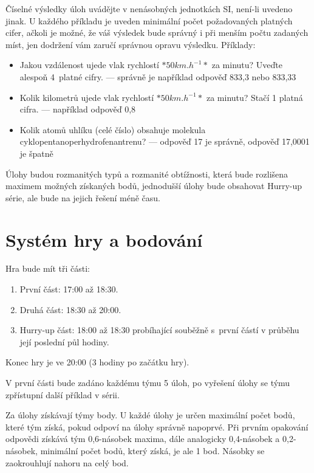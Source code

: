 \documentclass[a4paper,11pt,oneside]{article}
\begin{document}
Číselné výsledky úloh uvádějte v nenásobných jednotkách SI, není-li uvedeno 
jinak. U každého příkladu je uveden minimální počet požadovaných platných cifer, 
ačkoli je možné, že váš výsledek bude správný i při menším počtu zadaných míst, 
jen dodržení vám zaručí správnou opravu výsledku. Příklady:
\begin{itemize}
\item Jakou vzdálenost ujede vlak rychlostí $*50 km.h^{-1}*$ za minutu? Uveďte alespoň 4~platné cifry. — správně je například odpověď 833,3 nebo 833,33

\item Kolik kilometrů ujede vlak rychlostí $*50 km.h^{-1}*$ za minutu? Stačí 1 platná cifra. — například odpověď 0,8

\item Kolik atomů uhlíku (celé číslo) obsahuje molekula cyklopentanoperhydrofenantrenu? — odpověď 17 je správně, odpověď 17,0001 je špatně

\end{itemize}

Úlohy budou rozmanitých typů a rozmanité obtížnosti, která bude rozlišena 
maximem možných získaných bodů, jednodušší úlohy bude obsahovat Hurry-up série, 
ale bude na jejich řešení méně času.

\section{Systém hry a bodování}

Hra bude mít tři části:
\begin{enumerate}
\item První část: 17:00 až 18:30.
\item Druhá část: 18:30 až 20:00.
\item Hurry-up část: 18:00 až 18:30 probíhající souběžně s~první částí v průběhu její poslední půl hodiny.
\end{enumerate}
Konec hry je ve 20:00 (3 hodiny po začátku hry).

V první části bude zadáno každému týmu 5 úloh, po vyřešení úlohy se týmu 
zpřístupní další příklad v sérii.

Za úlohy získávají týmy body. U každé úlohy je určen maximální počet bodů, 
které tým získá, pokud odpoví na úlohy správně napoprvé. Při prvním opakování 
odpovědi získává tým 0,6-násobek maxima, dále analogicky 0,4-násobek a 
0,2-násobek, minimální počet bodů, který získá, je ale 1 bod. Násobky se 
zaokrouhlují nahoru na celý bod.
\end{document}
